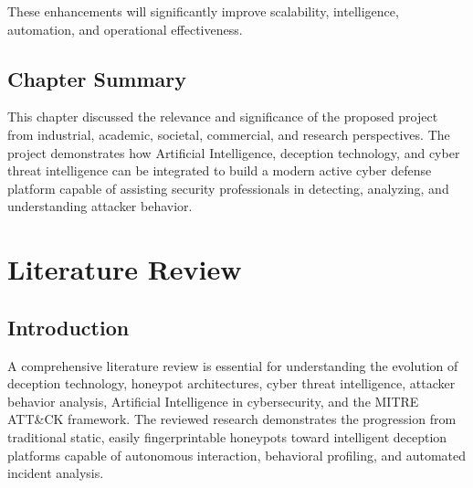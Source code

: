 \documentclass[12pt,a4paper]{report}
\begin{document}
These enhancements will significantly improve scalability, intelligence, automation, and operational effectiveness.


\section{Chapter Summary}

This chapter discussed the relevance and significance of the proposed project from industrial, academic, societal, commercial, and research perspectives. The project demonstrates how Artificial Intelligence, deception technology, and cyber threat intelligence can be integrated to build a modern active cyber defense platform capable of assisting security professionals in detecting, analyzing, and understanding attacker behavior.

\clearpage




\chapter{Literature Review}

\section{Introduction}

A comprehensive literature review is essential for understanding the evolution of deception technology, honeypot architectures, cyber threat intelligence, attacker behavior analysis, Artificial Intelligence in cybersecurity, and the MITRE ATT\&CK framework. The reviewed research demonstrates the progression from traditional static, easily fingerprintable honeypots toward intelligent deception platforms capable of autonomous interaction, behavioral profiling, and automated incident analysis.
\end{document}
